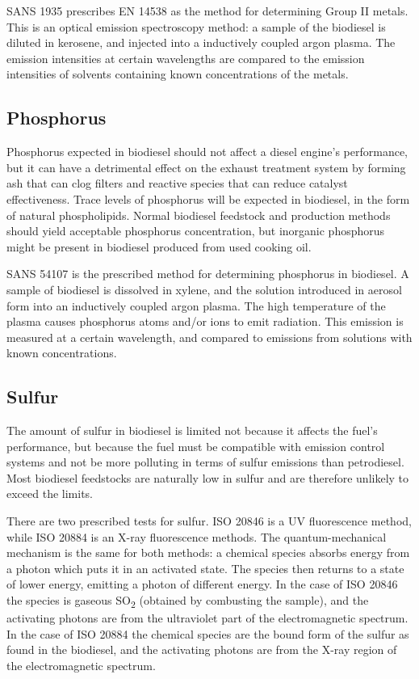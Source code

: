 SANS 1935 prescribes EN 14538 as the method for determining Group II metals.
This is an optical emission spectroscopy method: a sample of the biodiesel is
diluted in kerosene, and injected into a inductively coupled argon plasma. The
emission intensities at certain wavelengths are compared to the emission
intensities of solvents containing known concentrations of the metals.

\subsection{Phosphorus}

Phosphorus expected in biodiesel should not affect a diesel engine's
performance, but it can have a detrimental effect on the exhaust treatment
system by forming ash that can clog filters and reactive species that can reduce
catalyst effectiveness. Trace levels of phosphorus will be expected in
biodiesel, in the form of natural phospholipids. Normal biodiesel feedstock and
production methods should yield acceptable phosphorus concentration, but
inorganic phosphorus might be present in biodiesel produced from used cooking
oil.
 
SANS 54107 is the prescribed method for determining phosphorus in biodiesel. A
sample of biodiesel is dissolved in xylene, and the solution introduced in
aerosol form into an inductively coupled argon plasma. The high temperature of
the plasma causes phosphorus atoms and/or ions to emit radiation. This emission
is measured at a certain wavelength, and compared to emissions from solutions
with known concentrations.

\subsection{Sulfur}

The amount of sulfur in biodiesel is limited not because it affects the fuel's
performance, but because the fuel must be compatible with emission control
systems and not be more polluting in terms of sulfur emissions than petrodiesel.
Most biodiesel feedstocks are naturally low in sulfur and are therefore unlikely
to exceed the limits.

There are two prescribed tests for sulfur. ISO 20846 is a UV fluorescence
method, while ISO 20884 is an X-ray fluorescence methods. The quantum-mechanical
mechanism is the same for both methods: a chemical species absorbs energy from a
photon which puts it in an activated state. The species then returns to a state
of lower energy, emitting a photon of different energy.
In the case of ISO 20846 the species is gaseous SO\textsubscript{2} (obtained by
combusting the sample), and the activating photons are from the ultraviolet part
of the electromagnetic spectrum. In the case of ISO 20884 the chemical species
are the bound form of the sulfur as found in the biodiesel, and the activating
photons are from the X-ray region of the electromagnetic spectrum.

